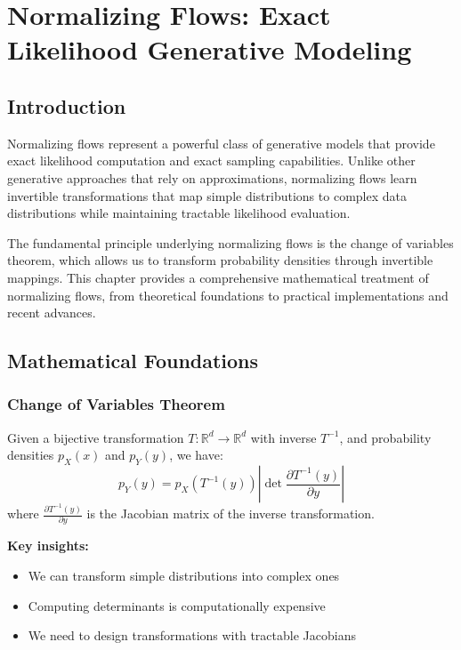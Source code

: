 \chapter{Normalizing Flows: Exact Likelihood Generative Modeling}

\section{Introduction}

Normalizing flows represent a powerful class of generative models that provide exact likelihood computation and exact sampling capabilities. Unlike other generative approaches that rely on approximations, normalizing flows learn invertible transformations that map simple distributions to complex data distributions while maintaining tractable likelihood evaluation.

The fundamental principle underlying normalizing flows is the change of variables theorem, which allows us to transform probability densities through invertible mappings. This chapter provides a comprehensive mathematical treatment of normalizing flows, from theoretical foundations to practical implementations and recent advances.

\section{Mathematical Foundations}

\subsection{Change of Variables Theorem}

Given a bijective transformation $T: \mathbb{R}^d \to \mathbb{R}^d$ with inverse $T^{-1}$, and probability densities $p_X(x)$ and $p_Y(y)$, we have:
\begin{equation}
    p_Y(y) = p_X(T^{-1}(y)) \left|\det \frac{\partial T^{-1}(y)}{\partial y}\right|
\end{equation}
where $\frac{\partial T^{-1}(y)}{\partial y}$ is the Jacobian matrix of the inverse transformation.

\textbf{Key insights:}
\begin{itemize}
    \item We can transform simple distributions into complex ones
    \item Computing determinants is computationally expensive
    \item We need to design transformations with tractable Jacobians
\end{itemize}

